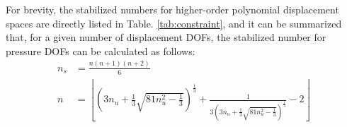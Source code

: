 For brevity, the stabilized numbers for higher-order polynomial displacement spaces are directly listed in Table. \ref{tab:constraint}, and it can be summarized that, for a given number of displacement DOFs, the stabilized number for pressure DOFs can be calculated as follows:
\begin{align}
n_s &= \frac{n(n + 1)(n + 2)}{6} \\
n &= \left\lfloor
\left( 3n_u + \frac{1}{3}\sqrt{81n_u^2 - \frac{1}{3}} \right)^{\frac{1}{3}}
+
\frac{1}{3\left( 3n_u + \frac{1}{3}\sqrt{81n_u^2 - \frac{1}{3}} \right)^{\frac{1}{3}}} - 2
\right\rfloor
\end{align}


